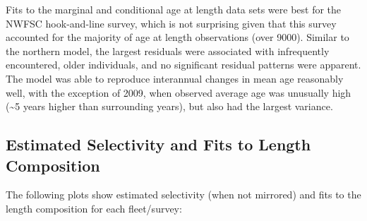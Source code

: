 \documentclass[11pt,
  english,
  a4paper,
]{article}
\begin{document}
\tagstructend

Fits to the marginal and conditional age at length data sets were best for the NWFSC hook-and-line survey, which is not surprising given that this survey accounted for the majority of age at length observations (over 9000). Similar to the northern model, the largest residuals were associated with infrequently encountered, older individuals, and no significant residual patterns were apparent. The model was able to reproduce interannual changes in mean age reasonably well, with the exception of 2009, when observed average age was unusually high (\textasciitilde5 years higher than surrounding years), but also had the largest variance.


\hypertarget{estimated-selectivity-and-fits-to-length-composition}{%
\subsection{Estimated Selectivity and Fits to Length Composition}\label{estimated-selectivity-and-fits-to-length-composition}}

\leavevmode\tagmcend\tagstructend

The following plots show estimated selectivity (when not mirrored) and fits to the length composition for each fleet/survey:

\end{document}
